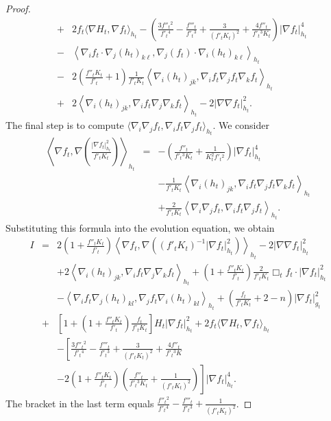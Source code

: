 \documentclass{amsart}
\theoremstyle{definition}
\theoremstyle{remark}
\numberwithin{equation}{section}
\begin{document}
\begin{proof}
\begin{eqnarray*}
&+&2f_{t}\langle\nabla H_{t},\nabla f_{t}\rangle_{h_{t}}-\left(\frac{3f''_{t}{}^{2}}{f'_{t}{}^{4}}
-\frac{f'''_{t}}{f'_{t}{}^{3}}
+\frac{3}{(f'_{t}K_{t})^{2}}+\frac{4f''_{t}}{f'_{t}{}^{3}K_{t}}
\right)|\nabla f_{t}|^{4}_{h_{t}}\\
&-&\left\langle\nabla_{i}f_{t}\cdot\nabla_{j}(h_{t})_{k\ell},\nabla_{j}(f_{t})
\cdot\nabla_{i}
(h_{t})_{k\ell}\right\rangle_{h_{t}}\\
&-&2\left(\frac{f''_{t}K_{t}}{f'_{t}}+1\right)\frac{1}{f'_{t}K_{t}}
\left\langle\nabla_{i}(h_{t})_{jk},
\nabla_{i}f_{t}\nabla_{j}f_{t}\nabla_{k}f_{t}\right\rangle_{h_{t}}\\
&+&2\left\langle\nabla_{i}(h_{t})_{jk},\nabla_{i}f_{t}\nabla_{j}\nabla_{k}f_{t}
\right\rangle_{h_{t}}-2|\nabla\nabla f_{t}|^{2}_{h_{t}}.
\end{eqnarray*}
The final step is to compute $\langle\nabla_{i}\nabla_{j}f_{t},\nabla_{i}f_{t}\nabla_{j}f_{t}
\rangle_{h_{t}}$. We consider
\begin{eqnarray*}
\left\langle\nabla f_{t},\nabla\left(\frac{|\nabla f_{t}|^{2}
_{h_{t}}}{f'_{t}K_{t}}\right)
\right\rangle_{h_{t}}&=&-\left(\frac{f''_{t}}{f'_{t}{}^{3}K_{t}}+\frac{1}{K^{2}_{t}f'_{t}{}^{2}}
\right)|\nabla f_{t}|^{4}_{h_{t}}\\
&&-\frac{1}{f'_{t}K_{t}}\left\langle\nabla_{i}(h_{t})_{jk},
\nabla_{i}f_{t}\nabla_{j}
f_{t}\nabla_{k}f_{t}\right\rangle_{h_{t}}\\
&&+\frac{2}{f'_{t}K_{t}}\left\langle\nabla_{i}\nabla_{j}f_{t},
\nabla_{i}f_{t}\nabla_{j}f_{t}\right\rangle_{h_{t}}.
\end{eqnarray*}
Substituting this formula into the evolution equation, we obtain
\begin{eqnarray*}
I&=&2\left(1+\frac{f''_{t}K_{t}}{f'_{t}}\right)\left\langle\nabla f_{t},\nabla\left((f'_{t}K_{t})^{-1}|\nabla f_{t}|^{2}_{h_{t}}\right)\right\rangle_{h_{t}}-2|\nabla\nabla f_{t}|^{2}_{h_{t}}\\
&&+2\left\langle\nabla_{i}(h_{t})_{jk},\nabla_{i}f_{t}
\nabla_{j}\nabla_{k}f_{t}\right\rangle_{h_{t}}
+\left(1+\frac{f''_{t}K_{t}}{f'_{t}}\right)\frac{2}{f'_{t}K_{t}}\Box_{t} f_{t}
\cdot|\nabla f_{t}|^{2}_{h_{t}}\\
&&-\left\langle\nabla_{i}f_{t}\nabla_{j}(h_{t})_{kl},\nabla_{j}f_{t}
\nabla_{i}(h_{t})_{kl}\right\rangle_{h_{t}}
+\left(\frac{f_{t}}{f'_{t}K_{t}}+2-n\right)|\nabla f_{t}|^{2}_{g_{t}}\\
&+&\left[1+\left(1+\frac{f''_{t}K_{t}}{f'_{t}}\right)\frac{f_{t}}{f'_{t}K_{t}}
\right]H_{t}|\nabla f_{t}|^{2}_{h_{t}}+2f_{t}\langle\nabla H_{t},
\nabla f_{t}\rangle_{h_{t}}\\
&&-\left[\frac{3f''_{t}{}^{2}}{f'_{t}{}^{4}}-\frac{f'''_{t}}{f'_{t}{}^{3}}
+\frac{3}{(f'_{t}K_{t})^{2}}+\frac{4f''_{t}}{f'_{t}{}^{3}K}
\right.\\
&&-\left.2\left(1+\frac{f''_{t}K_{t}}{f'_{t}}\right)\left(\frac{f''_{t}}
{f'_{t}{}^{3}K_{t}}+\frac{1}{(f'_{t}K_{t})^{2}}\right)\right]|\nabla f_{t}|^{4}_{h_{t}}.
\end{eqnarray*}
The bracket in the last term equals $\frac{f''_{t}{}^{2}}{f'_{t}{}^{4}}
-\frac{f'''_{t}}{f'_{t}{}^{3}}
+\frac{1}{(f'_{t}K_{t})^{2}}$.
\end{proof}
\end{document}
